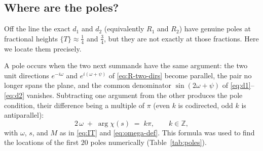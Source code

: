 \documentclass[11pt]{article}
\theoremstyle{definition}
\begin{document}
\subsection{Where are the poles?}\label{sec:pole-locations}

Off the line the exact $d_1$ and $d_2$ (equivalently $R_{1}$ and $R_{2}$)
have genuine poles at fractional heights $\{T\}\approx\tfrac14$ and
$\tfrac34$, but they are not exactly at those fractions. Here we locate
them precisely.

A pole occurs when the two next summands have the same argument: the two
unit directions $e^{-i\omega}$ and $e^{i(\omega+\psi)}$ of
\eqref{eq:R-two-dirs} become parallel, the pair no longer spans the plane,
and the common denominator $\sin(2\omega+\psi)$ of
\eqref{eq:d1}--\eqref{eq:d2} vanishes. Subtracting one argument from the
other produces the pole condition, their difference being a multiple of
$\pi$ (even $k$ is codirected, odd $k$ is antiparallel):
\begin{equation}\label{eq:pole-condition}
2\,\omega \;+\; \arg\chi(s) \;=\; k\pi,
\qquad k\in\mathbb{Z},
\end{equation}
with $\omega$, $s$, and $M$ as in \eqref{eq:IT} and
\eqref{eq:omega-def}.
This formula was used to find the locations of the first $20$ poles
numerically (Table~\ref{tab:poles}).
\end{document}
